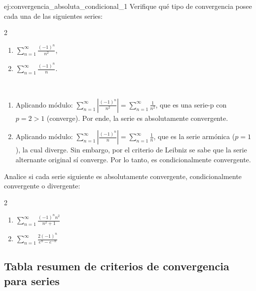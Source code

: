 \begin{example}{}{ej:convergencia_absoluta_condicional_1}
    Verifique qué tipo de convergencia posee cada una de las siguientes series:
    \begin{multicols}{2}
    \begin{enumerate}
        \item $\displaystyle \sum_{n=1}^{\infty}{\frac{(-1)^n}{n^2}}$,
        \item $\displaystyle \sum_{n=1}^{\infty} \frac{(-1)^n}{n}$.
    \end{enumerate}
    \end{multicols}
\end{example}

\begin{soln}
    $\left. \right.$
    \begin{enumerate}
        \item Aplicando módulo: $\displaystyle \sum_{n=1}^{\infty}\left|\frac{(-1)^n}{n^2}\right| = \displaystyle \sum_{n=1}^{\infty} \frac{1}{n^2}$, que es una serie-p con $p=2 > 1$ (converge). Por ende, la serie es absolutamente convergente.
        
        \item Aplicando módulo: $\displaystyle \sum_{n=1}^{\infty}\left|\frac{(-1)^n}{n}\right| = \displaystyle \sum_{n=1}^{\infty} \frac{1}{n}$, que es la serie armónica ($p=1$), la cual diverge. Sin embargo, por el criterio de Leibniz se sabe que la serie alternante original sí converge. Por lo tanto, es condicionalmente convergente.
    \end{enumerate}
\end{soln}

\begin{problem}{}{}
    Analice si cada serie siguiente es absolutamente convergente, condicionalmente convergente o divergente:
    \begin{multicols}{2}
        \begin{enumerate}
            \item $\displaystyle \sum_{n=1}^{\infty} \frac{(-1)^n n^2}{n^2+1}$
            \item $\displaystyle \sum_{n=1}^{\infty} \frac{2(-1)^n}{e^n - e^{-n}}$
        \end{enumerate}
    \end{multicols}
\end{problem}

\newpage
\subsection{Tabla resumen de criterios de convergencia para series}

